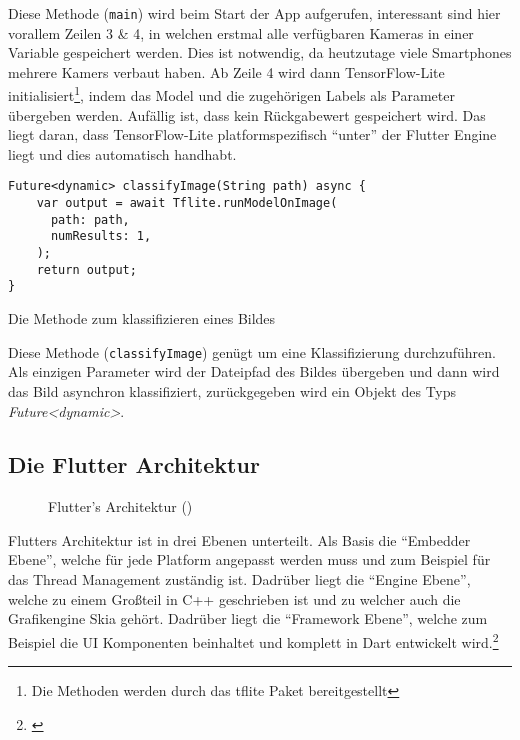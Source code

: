 Diese Methode (\texttt{main}) wird beim Start der App aufgerufen, interessant sind hier vorallem Zeilen 3 \& 4, in welchen erstmal alle verfügbaren Kameras in einer Variable gespeichert werden. Dies ist notwendig, da heutzutage viele Smartphones mehrere Kamers verbaut haben. Ab Zeile 4 wird dann TensorFlow-Lite initialisiert\footnote{Die Methoden werden durch das tflite Paket bereitgestellt\cite{tflitepackage}}, indem das Model und die zugehörigen Labels als Parameter übergeben werden. Aufällig ist, dass kein Rückgabewert gespeichert wird. Das liegt daran, dass TensorFlow-Lite platformspezifisch "`unter"' der Flutter Engine liegt und dies automatisch handhabt.

\begin{listing}[H]
    \begin{verbatim}
Future<dynamic> classifyImage(String path) async {
    var output = await Tflite.runModelOnImage(
      path: path,
      numResults: 1,
    );
    return output;
}
    \end{verbatim}
    \caption{Die Methode zum klassifizieren eines Bildes}
\end{listing}

Diese Methode (\texttt{classifyImage}) genügt um eine Klassifizierung durchzuführen. Als einzigen Parameter wird der Dateipfad des Bildes übergeben und dann wird das Bild asynchron klassifiziert, zurückgegeben wird ein Objekt des Typs \emph{Future<dynamic>}.

\subsection{Die Flutter Architektur}\label{anhang:flutterarc}

\begin{figure}[H]
    \centering
    \resizebox{\textwidth}{!}{
        
    }
    \caption{Flutter's Architektur (\cite{flutterarchitecture})}
\end{figure}

Flutters Architektur ist in drei Ebenen unterteilt. Als Basis die "`Embedder Ebene"', welche für jede Platform angepasst werden muss und zum Beispiel für das Thread Management zuständig ist. Dadrüber liegt die "`Engine Ebene"', welche zu einem Großteil in C++ geschrieben ist und zu welcher auch die Grafikengine Skia gehört. Dadrüber liegt die "`Framework Ebene"', welche zum Beispiel die UI Komponenten beinhaltet und komplett in Dart entwickelt wird.\footnote{\cite{flutterarchitecture}}